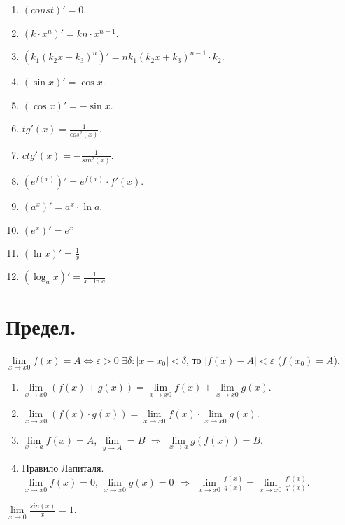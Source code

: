 \documentclass[12pt]{article}
\begin{document}
	\begin{property}
		\begin{enumerate}
			\item $(const)' = 0$.
			\item $(k \cdot x^n)' = kn \cdot x^{n - 1}$.
			\item $(k_1(k_2x + k_3)^n)' = nk_1(k_2x + k_3)^{n - 1} \cdot k_2$.
			\item $(\sin x)' = \cos x$.
			\item $(\cos x)' = - \sin x$.
			\item $tg'(x) = \frac{1}{cos^2(x)}$.
			\item $ctg'(x) = - \frac{1}{sin^2(x)}$.
			\item $(e^{f(x)})' = e^{f(x)} \cdot f'(x)$.
			\item $(a^x)' = a^x \cdot \ln a$.
			\item $(e^x)' = e^x$
			\item $(\ln x)' = \frac{1}{x}$
			\item $(\log_a x)' = \frac{1}{x \cdot \ln a}$
		\end{enumerate}
	\end{property}
	\section{Предел.}
	\begin{definition}[По Коши]
		$\lim \limits_{x \rightarrow x0} f(x) = A \Leftrightarrow \varepsilon > 0$ $\exists \delta: |x - x_0| < \delta$, то $|f(x) - A| < \varepsilon$ ($f(x_0) = A$).
	\end{definition}
	\begin{property}
		\begin{enumerate}
			\item $\lim \limits_{x \rightarrow x0} (f(x) \pm g(x)) = \lim \limits_{x \rightarrow x0} f(x) \pm \lim \limits_{x \rightarrow x0} g(x)$.
			\item $\lim \limits_{x \rightarrow x0} (f(x) \cdot g(x)) = \lim \limits_{x \rightarrow x0} f(x) \cdot \lim \limits_{x \rightarrow x0} g(x)$.
			\item $\lim \limits_{x \rightarrow a} f(x) = A$, $\lim \limits_{y \rightarrow A} = B$ $\Rightarrow$ $\lim \limits_{x \rightarrow a} g(f(x)) = B$.
			\item Правило Лапиталя. \\
			$\lim \limits_{x \rightarrow x0} f(x) = 0$, $\lim \limits_{x \rightarrow x0} g(x) = 0$ $\Rightarrow$ $\lim \limits_{x \rightarrow x0} \frac{f(x)}{g(x)} = \lim \limits_{x \rightarrow x0} \frac{f'(x)}{g'(x)}$.
		\end{enumerate}
	\end{property}
	\begin{statement}
		$\lim \limits_{x \rightarrow 0} \frac{sin(x)}{x} = 1$.
	\end{statement}
\end{document}
